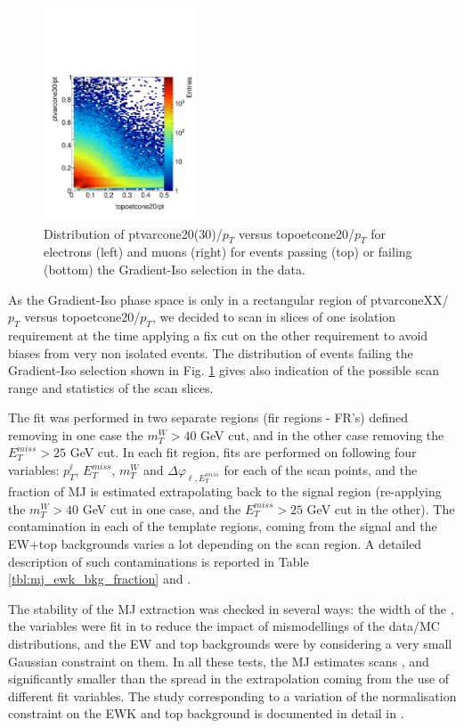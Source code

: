 \begin{figure}[htbp]
\includegraphics[width=0.4\textwidth]{figures/mj/plot2D-Data2015_MJ-mu_lep_0_iso_topoetcone20dPtVSmu_lep_0_iso_ptvarcone30dPt-mu.pdf}
\caption{
 Distribution of ptvarcone20(30)/$p_T$ versus topoetcone20/$p_T$ for electrons (left) and muons (right) for events passing (top) or failing (bottom) the Gradient-Iso selection in the data.
}
\label{fig:isolation_2D}
\end{figure}

As the Gradient-Iso phase space is only in a rectangular region of ptvarconeXX/$p_T$ versus topoetcone20/$p_T$, we decided to scan in slices of one isolation requirement at the time applying a fix cut on the other requirement to avoid biases from very non isolated events. 
The distribution of events failing the Gradient-Iso selection shown in Fig. \ref{fig:isolation_2D} gives also indication of the possible scan range and statistics of the scan  slices.

The fit was performed in two separate regions (fir regions - FR’s) defined removing in one case the $m_T^W > 40$ GeV cut, and in the other case removing the $E_T^{miss} > 25$ GeV cut.
In each fit region, fits are performed on following four variables: $p_T^{\ell}$, $E_T^{miss}$, $m_T^{W}$ and $\Delta \varphi _{\ell,E_T^{miss}}$ for each of the scan points, and the fraction of MJ is estimated extrapolating back to the signal region (re-applying the $m_T^W > 40$ GeV cut in one case, and the $E_T^{miss} > 25$ GeV cut in the other).
The contamination in each of the template regions, coming from the signal and the EW+top backgrounds varies a lot depending on the scan region.
A detailed description of such contaminations is reported in Table \ref{tbl:mj_ewk_bkg_fraction} and .

The stability of the MJ extraction was checked in several ways: the width of the , the variables were fit in  to reduce the impact of mismodellings of the data/MC distributions, and the EW and top backgrounds were  by considering a very small Gaussian constraint on them.
In all these tests, the MJ estimates scans , and significantly smaller than the spread in the extrapolation coming from the use of different fit variables.
The study corresponding to a variation of the normalisation constraint on the EWK and top background is documented in detail in .

